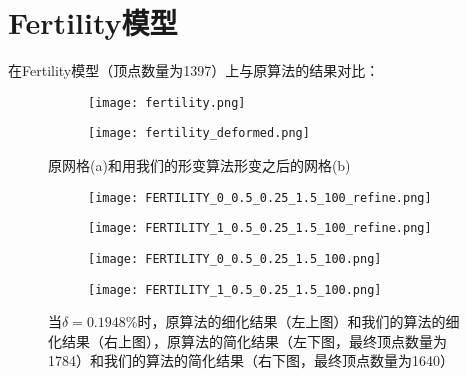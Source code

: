 \section{Fertility模型}
在Fertility模型（顶点数量为1397）上与原算法的结果对比：
\begin{figure}[htbp]
  \centering
  \begin{subfigure}[b]{0.4\textwidth}
    \texttt{[image: fertility.png]}
    \end{subfigure}
    \begin{subfigure}[b]{0.4\textwidth}
      \texttt{[image: fertility\_deformed.png]}
    \end{subfigure}
    \caption[fertility形变结果]{原网格(a)和用我们的形变算法形变之后的网格(b)}
    \label{fig:fertility-deform}
\end{figure}

\begin{figure}[htbp]
  \centering
  \begin{subfigure}[b]{0.4\textwidth}
    \texttt{[image: FERTILITY\_0\_0.5\_0.25\_1.5\_100\_refine.png]}
  \end{subfigure}
  \begin{subfigure}[b]{0.4\textwidth}
    \texttt{[image: FERTILITY\_1\_0.5\_0.25\_1.5\_100\_refine.png]}
  \end{subfigure}
  \begin{subfigure}[b]{0.4\textwidth}
    \texttt{[image: FERTILITY\_0\_0.5\_0.25\_1.5\_100.png]}
  \end{subfigure}
  \begin{subfigure}[b]{0.4\textwidth}
    \texttt{[image: FERTILITY\_1\_0.5\_0.25\_1.5\_100.png]}
  \end{subfigure}
  \caption[当$\delta=0.1948\%$时fertility结果对比]{当$\delta=0.1948\%$时，原算法的细化结果（左上图）和我们的算法的细化结果（右上图），原算法的简化结果（左下图，最终顶点数量为1784）和我们的算法的简化结果（右下图，最终顶点数量为1640）}
  \label{fig:fertility-res1}
\end{figure}

